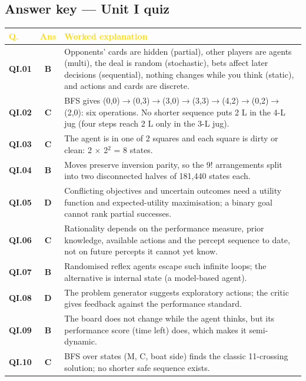 \subsection*{Answer key --- Unit I quiz}
\begin{longtable}{>{\leavevmode\bfseries\color{navy}}p{1.3cm} c p{13.2cm}}
\rowcolor{navy}\textcolor{gold}{\textbf{Q.}}&\textcolor{gold}{\textbf{Ans}}&\textcolor{gold}{\textbf{Worked explanation}}\\\endhead
QI.01&\textbf{\color{leaf}B}&Opponents' cards are hidden (partial), other players are agents (multi), the deal is random (stochastic), bets affect later decisions (sequential), nothing changes while you think (static), and actions and cards are discrete.\\
\rowcolor{ivory}QI.02&\textbf{\color{leaf}C}&BFS gives (0,0)$\to$(0,3)$\to$(3,0)$\to$(3,3)$\to$(4,2)$\to$(0,2)$\to$(2,0): six operations. No shorter sequence puts 2 L in the 4-L jug (four steps reach 2 L only in the 3-L jug).\\
QI.03&\textbf{\color{leaf}C}&The agent is in one of 2 squares and each square is dirty or clean: 2 $\times$ 2$^2$ = 8 states.\\
\rowcolor{ivory}QI.04&\textbf{\color{leaf}B}&Moves preserve inversion parity, so the 9! arrangements split into two disconnected halves of 181,440 states each.\\
QI.05&\textbf{\color{leaf}D}&Conflicting objectives and uncertain outcomes need a utility function and expected-utility maximisation; a binary goal cannot rank partial successes.\\
\rowcolor{ivory}QI.06&\textbf{\color{leaf}C}&Rationality depends on the performance measure, prior knowledge, available actions and the percept sequence to date, not on future percepts it cannot yet know.\\
QI.07&\textbf{\color{leaf}B}&Randomised reflex agents escape such infinite loops; the alternative is internal state (a model-based agent).\\
\rowcolor{ivory}QI.08&\textbf{\color{leaf}D}&The problem generator suggests exploratory actions; the critic gives feedback against the performance standard.\\
QI.09&\textbf{\color{leaf}B}&The board does not change while the agent thinks, but its performance score (time left) does, which makes it semi-dynamic.\\
\rowcolor{ivory}QI.10&\textbf{\color{leaf}C}&BFS over states (M, C, boat side) finds the classic 11-crossing solution; no shorter safe sequence exists.\\

\end{longtable}
